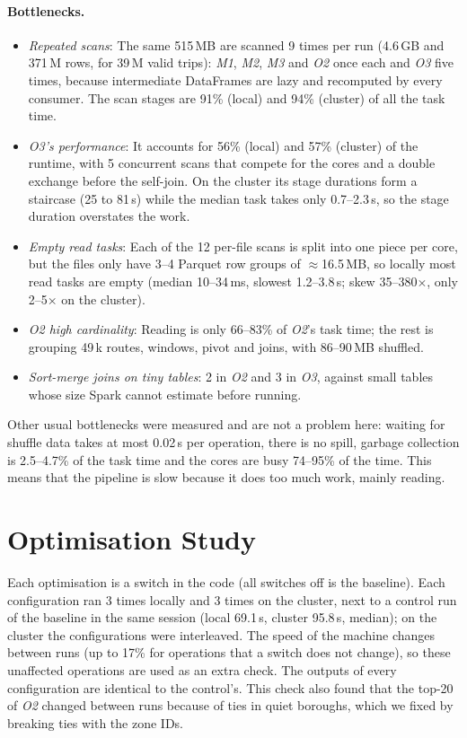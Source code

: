 \documentclass[10pt,a4paper]{article}
\begin{document}
\paragraph{Bottlenecks.}
\begin{itemize}
  \item \emph{Repeated scans}: The same 515\,MB are scanned 9 times per run (4.6\,GB and 371\,M rows, for 39\,M valid trips): \textit{M1}, \textit{M2}, \textit{M3} and \textit{O2} once each and \textit{O3} five times, because intermediate DataFrames are lazy and recomputed by every consumer. The scan stages are 91\% (local) and 94\% (cluster) of all the task time.
  \item \emph{O3's performance}: It accounts for 56\% (local) and 57\% (cluster) of the runtime, with 5 concurrent scans that compete for the cores and a double exchange before the self-join. On the cluster its stage durations form a staircase (25 to 81\,s) while the median task takes only 0.7--2.3\,s, so the stage duration overstates the work.
  \item \emph{Empty read tasks}: Each of the 12 per-file scans is split into one piece per core, but the files only have 3--4 Parquet row groups of $\approx$16.5\,MB, so locally most read tasks are empty (median 10--34\,ms, slowest 1.2--3.8\,s; skew 35--380$\times$, only 2--5$\times$ on the cluster).
  \item \emph{O2 high cardinality}: Reading is only 66--83\% of \textit{O2}'s task time; the rest is grouping 49\,k routes, windows, pivot and joins, with 86--90\,MB shuffled.
  \item \emph{Sort-merge joins on tiny tables}: 2 in \textit{O2} and 3 in \textit{O3}, against small tables whose size Spark cannot estimate before running.
\end{itemize}
Other usual bottlenecks were measured and are not a problem here: waiting for shuffle data takes at most 0.02\,s per operation, there is no spill, garbage collection is 2.5--4.7\% of the task time and the cores are busy 74--95\% of the time. This means that the pipeline is slow because it does too much work, mainly reading.

\section{Optimisation Study} \label{optmisation}
Each optimisation is a switch in the code (all switches off is the baseline). Each configuration ran 3 times locally and 3 times on the cluster, next to a control run of the baseline in the same session (local 69.1\,s, cluster 95.8\,s, median); on the cluster the configurations were interleaved. The speed of the machine changes between runs (up to 17\% for operations that a switch does not change), so these unaffected operations are used as an extra check. The outputs of every configuration are identical to the control's. This check also found that the top-20 of \textit{O2} changed between runs because of ties in quiet boroughs, which we fixed by breaking ties with the zone IDs.
\end{document}
